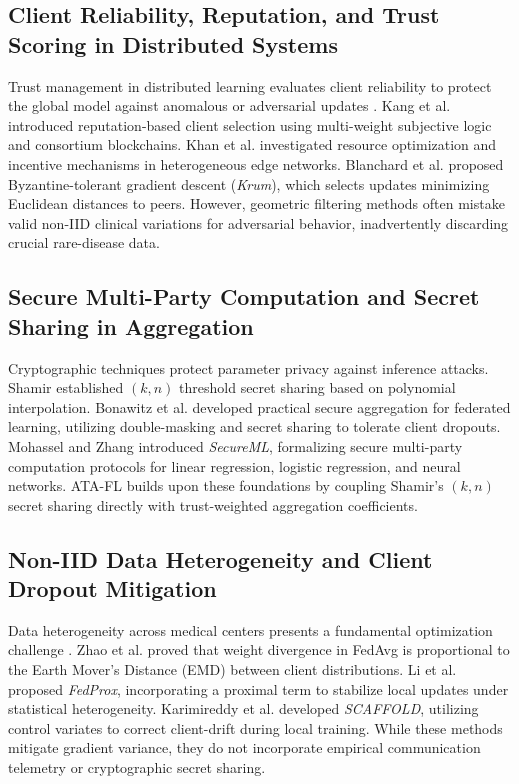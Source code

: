\documentclass[conference]{IEEEtran}
\begin{document}
\subsection{Client Reliability, Reputation, and Trust Scoring in Distributed Systems}
Trust management in distributed learning evaluates client reliability to protect the global model against anomalous or adversarial updates \cite{kang2019incentive, khan2020federated, blanchard2017machine}. Kang et al. \cite{kang2019incentive} introduced reputation-based client selection using multi-weight subjective logic and consortium blockchains. Khan et al. \cite{khan2020federated} investigated resource optimization and incentive mechanisms in heterogeneous edge networks. Blanchard et al. \cite{blanchard2017machine} proposed Byzantine-tolerant gradient descent (\textit{Krum}), which selects updates minimizing Euclidean distances to peers. However, geometric filtering methods often mistake valid non-IID clinical variations for adversarial behavior, inadvertently discarding crucial rare-disease data.

\subsection{Secure Multi-Party Computation and Secret Sharing in Aggregation}
Cryptographic techniques protect parameter privacy against inference attacks. Shamir \cite{shamir1979share} established $(k, n)$ threshold secret sharing based on polynomial interpolation. Bonawitz et al. \cite{bonawitz2017practical} developed practical secure aggregation for federated learning, utilizing double-masking and secret sharing to tolerate client dropouts. Mohassel and Zhang \cite{mohassel2017secureml} introduced \textit{SecureML}, formalizing secure multi-party computation protocols for linear regression, logistic regression, and neural networks. ATA-FL builds upon these foundations by coupling Shamir's $(k, n)$ secret sharing directly with trust-weighted aggregation coefficients.

\subsection{Non-IID Data Heterogeneity and Client Dropout Mitigation}
Data heterogeneity across medical centers presents a fundamental optimization challenge \cite{zhao2021federated, li2020federated, karimireddy2020scaffold}. Zhao et al. \cite{zhao2021federated} proved that weight divergence in FedAvg is proportional to the Earth Mover's Distance (EMD) between client distributions. Li et al. \cite{li2020federated} proposed \textit{FedProx}, incorporating a proximal term to stabilize local updates under statistical heterogeneity. Karimireddy et al. \cite{karimireddy2020scaffold} developed \textit{SCAFFOLD}, utilizing control variates to correct client-drift during local training. While these methods mitigate gradient variance, they do not incorporate empirical communication telemetry or cryptographic secret sharing.
\end{document}
